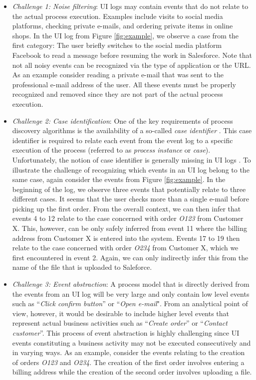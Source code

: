 \begin{itemize}
\item \textit{Challenge 1: Noise filtering}: UI logs may contain events that do not relate to the actual process execution. Examples include visits to social media platforms, checking private e-mails, and ordering private items in online shops. In the UI log from Figure \ref{fig:example}, we observe a case from the first category: The user briefly switches to the social media platform Facebook to read a message before resuming the work in Salesforce. Note that not all noisy events can be recognized via the type of application or the URL. As an example consider reading a private e-mail that was sent to the professional e-mail address of the user. All these events must be properly recognized and removed since they are not part of the actual process execution. 
  
\item \textit{Challenge 2: Case identification}: One of the key requirements of process discovery algorithms is the availability of a so-called \textit{case identifier} \cite{van2016data}. This case identifier is required to relate each event from the event log to a specific execution of the process (referred to as \textit{process instance} or \textit{case}). Unfortunately, the notion of case identifier is generally missing in UI logs \cite{leno2021robotic}. To illustrate the challenge of recognizing which events in an UI log belong to the same case, again consider the events from Figure \ref{fig:example}. In the beginning of the log, we observe three events that potentially relate to three different cases. It seems that the user checks more than a single e-mail before picking up the first order. From the overall context, we can then infer that events 4 to 12 relate to the case concerned with order \textit{O123} from Customer X. This, however, can be only safely inferred from event 11 where the billing address from Customer X is entered into the system. Events 17 to 19 then relate to the case concerned with order \textit{O234} from Customer X, which we first encountered in event 2. Again, we can only indirectly infer this from the name of the file that is uploaded to Saleforce. 

\item \textit{Challenge 3: Event abstraction}: A process model that is directly derived from the events from an UI log will be very large and only contain low level events such as ``\textit{Click confirm button}'' or ``\textit{Open e-mail}". From an analytical point of view, however,  it would be desirable to include higher level events that represent actual business activities such as ``\textit{Create order}'' or ``\textit{Contact customer}''. This process of event abstraction is highly challenging since UI events constituting a business activity may not be executed consecutively and in varying ways. As an example, consider the events relating to the creation of orders \textit{O123} and \textit{O234}. The creation of the first order involves entering a billing address while the creation of the second order involves uploading a file. 


\end{itemize}
